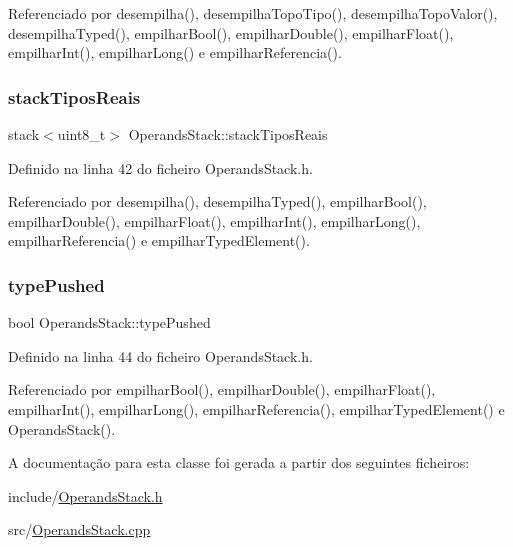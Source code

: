 Referenciado por desempilha(), desempilha\+Topo\+Tipo(), desempilha\+Topo\+Valor(), desempilha\+Typed(), empilhar\+Bool(), empilhar\+Double(), empilhar\+Float(), empilhar\+Int(), empilhar\+Long() e empilhar\+Referencia().

\mbox{\label{classOperandsStack_a14729c0f92cf41d1ec65660a7c82555a}} 
\subsubsection{\texorpdfstring{stack\+Tipos\+Reais}{stackTiposReais}}
{\footnotesize\ttfamily stack$<$uint8\+\_\+t$>$ Operands\+Stack\+::stack\+Tipos\+Reais\hspace{0.3cm}{\ttfamily [private]}}



Definido na linha 42 do ficheiro Operands\+Stack.\+h.



Referenciado por desempilha(), desempilha\+Typed(), empilhar\+Bool(), empilhar\+Double(), empilhar\+Float(), empilhar\+Int(), empilhar\+Long(), empilhar\+Referencia() e empilhar\+Typed\+Element().

\mbox{\label{classOperandsStack_a375521777d4992bc1018eb40da015e70}} 
\subsubsection{\texorpdfstring{type\+Pushed}{typePushed}}
{\footnotesize\ttfamily bool Operands\+Stack\+::type\+Pushed\hspace{0.3cm}{\ttfamily [private]}}



Definido na linha 44 do ficheiro Operands\+Stack.\+h.



Referenciado por empilhar\+Bool(), empilhar\+Double(), empilhar\+Float(), empilhar\+Int(), empilhar\+Long(), empilhar\+Referencia(), empilhar\+Typed\+Element() e Operands\+Stack().



A documentação para esta classe foi gerada a partir dos seguintes ficheiros\+:\begin{DoxyCompactItemize}
\item 
include/\hyperlink{OperandsStack_8h}{Operands\+Stack.\+h}\item 
src/\hyperlink{OperandsStack_8cpp}{Operands\+Stack.\+cpp}\end{DoxyCompactItemize}
